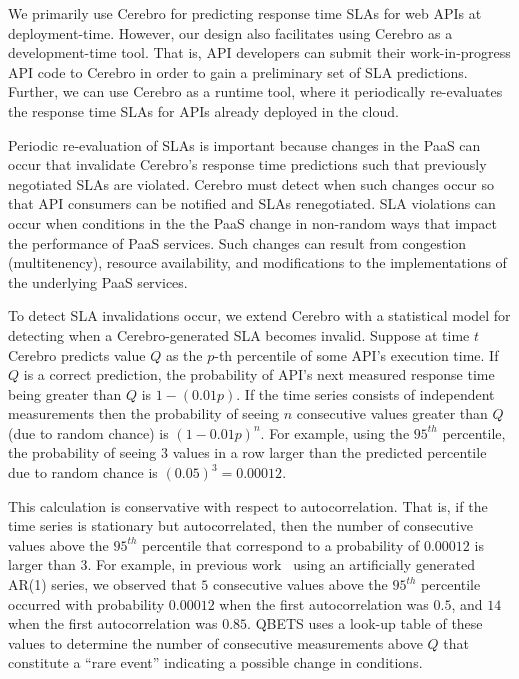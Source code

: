 We primarily use Cerebro for predicting response time SLAs for web APIs
at deployment-time. However, our design also facilitates using
Cerebro as a development-time tool. That is, API developers can submit their work-in-progress
API code to Cerebro in order to gain a preliminary set of SLA predictions. Further, we can use
Cerebro as a runtime tool, where it periodically re-evaluates the response time SLAs for 
APIs already deployed in the cloud.

Periodic re-evaluation of SLAs is important because changes in the PaaS can occur
that invalidate Cerebro's response time predictions such that previously negotiated SLAs are violated.
Cerebro must detect when such changes occur so that API consumers can be notified and 
SLAs renegotiated.  SLA violations
can occur when conditions in the the PaaS change in non-random ways that impact 
the performance of PaaS services.  Such changes can result from congestion (multitenency), 
resource availability, and modifications to the implementations of the underlying PaaS services. 

To detect SLA invalidations occur, we extend Cerebro with a 
statistical model for detecting when a Cerebro-generated SLA becomes invalid. 
Suppose at time $t$ Cerebro predicts value $Q$ as the $p$-th percentile of
some API's execution time.  If $Q$ is a correct prediction,
the probability of API's next measured response time being greater than 
$Q$ is $1-(0.01p)$.  If the time series consists of independent
measurements then the probability of seeing $n$ consecutive values greater
than $Q$ (due to random chance) is $(1-0.01p)^n$. 
For example, using the $95^{th}$ percentile, the probability of seeing $3$
values in a row larger than the predicted percentile due to random chance
is $(0.05)^3 = 0.00012$.

This calculation is conservative with respect to autocorrelation. That is, if
the time series is stationary but autocorrelated, then the number of consecutive 
values above the $95^{th}$ percentile that correspond to a probability of
$0.00012$ is larger than $3$.  For example, in previous
work~\cite{Nurmi:2007:QQB:1791551.1791556}
using an artificially generated AR(1) series, 
we observed that $5$ consecutive values above the $95^{th}$ percentile
occurred with probability $0.00012$ when the first autocorrelation was $0.5$,
and $14$ when the first autocorrelation was $0.85$. QBETS uses a look-up
table of these values to determine the number of consecutive measurements above
$Q$ that constitute a ``rare event'' indicating a possible change in conditions.

